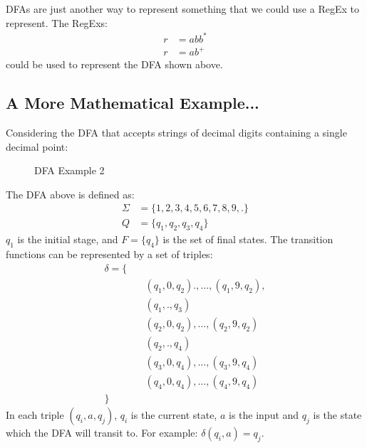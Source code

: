 DFAs are just another way to represent something that we could use a RegEx to represent. The RegExs:
\begin{align*}
    r &= abb^*\\
    r &= ab ^+
\end{align*}
could be used to represent the DFA shown above. 

\subsection{A More Mathematical Example...}
Considering the DFA that accepts strings of decimal digits containing a single decimal point:
\begin{figure}[H]
    \centering
    \caption{DFA Example 2}
\end{figure}

The DFA above is defined as:
\begin{align*}
    \Sigma &= \{1, 2, 3, 4, 5, 6, 7, 8, 9, .\}\\
    Q &= \{q_1, q_2, q_3, q_4\}
\end{align*}
$q_1$ is the initial stage, and $F=\{q_4\}$ is the set of final states. The transition functions can be represented by a set of triples:
\begin{align*}
    \delta = \{\quad &\\
        & (q_1, 0, q_2)., \ldots, (q_1, 9, q_2),\\
        & (q_1, ., q_3)\\
        & (q_2, 0, q_2), \ldots, (q_2, 9, q_2)\\
        & (q_2, ., q_4)\\
        & (q_3, 0, q_4), \ldots, (q_3, 9, q_4)\\
        & (q_4, 0, q_4), \ldots, (q_4, 9, q_4)\\
    \}\quad &
\end{align*}
In each triple $(q_i, a, q_j)$, $q_i$ is the current state, $a$ is the input and $q_j$ is the state which the DFA will transit to. For example: $\delta(q_i, a)=q_j$.

